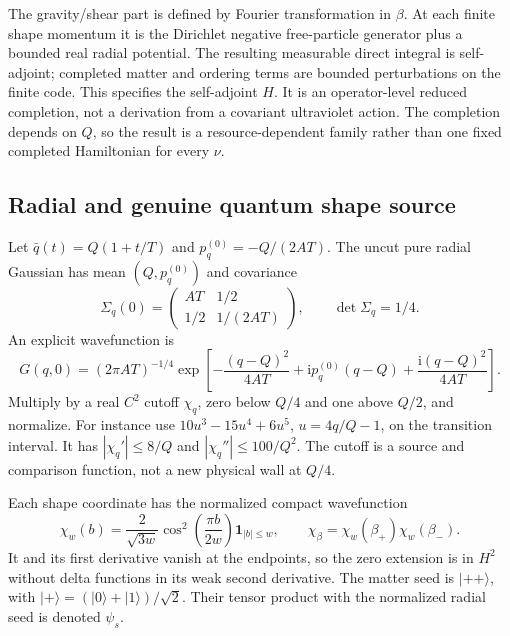 \documentclass[11pt]{article}
\newcommand{\ii}{\mathrm{i}}
\newcommand{\Id}{\mathbf 1}
\begin{document}
The gravity/shear part is defined by Fourier transformation in $\beta$.
At each finite shape momentum it is the Dirichlet negative free-particle generator plus a bounded real radial potential.
The resulting measurable direct integral is self-adjoint; completed matter and ordering terms are bounded perturbations on the finite code.
This specifies the self-adjoint $H$.
It is an operator-level reduced completion, not a derivation from a covariant ultraviolet action.
The completion depends on $Q$, so the result is a resource-dependent family rather than one fixed completed Hamiltonian for every $\nu$.

\subsection{Radial and genuine quantum shape source}

Let $\bar q(t)=Q(1+t/T)$ and $p_q^{(0)}=-Q/(2AT)$.
The uncut pure radial Gaussian has mean $(Q,p_q^{(0)})$ and covariance
\begin{equation}
 \Sigma_q(0)=\begin{pmatrix}AT&1/2\\1/2&1/(2AT)\end{pmatrix},
 \qquad\det\Sigma_q=1/4.\label{eq:radialcov}
\end{equation}
An explicit wavefunction is
\[
 G(q,0)=(2\pi AT)^{-1/4}
 \exp\left[-\frac{(q-Q)^2}{4AT}
 +\ii p_q^{(0)}(q-Q)+\frac{\ii(q-Q)^2}{4AT}\right].
\]
Multiply by a real $C^2$ cutoff $\chi_q$, zero below $Q/4$ and one above $Q/2$, and normalize.
For instance use $10u^3-15u^4+6u^5$, $u=4q/Q-1$, on the transition interval.
It has $|\chi_q'|\le8/Q$ and $|\chi_q''|\le100/Q^2$.
The cutoff is a source and comparison function, not a new physical wall at $Q/4$.

Each shape coordinate has the normalized compact wavefunction
\begin{equation}
 \chi_w(b)=\frac2{\sqrt{3w}}\cos^2\left(\frac{\pi b}{2w}\right)\Id_{|b|\le w},
 \qquad\chi_\beta=\chi_w(\beta_+)\chi_w(\beta_-).\label{eq:shapechi}
\end{equation}
It and its first derivative vanish at the endpoints, so the zero extension is in $H^2$ without delta functions in its weak second derivative.
The matter seed is $|++\rangle$, with $|+\rangle=(|0\rangle+|1\rangle)/\sqrt2$.
Their tensor product with the normalized radial seed is denoted $\psi_s$.
\end{document}

